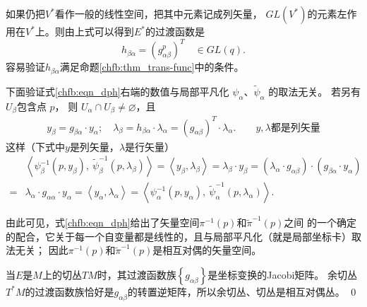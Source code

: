 如果仍把$V^*$看作一般的线性空间，把其中元素记成列矢量，
$GL(V^*)$的元素左作用在$V^*$上。则由上式可以得到$E^*$的过渡函数是
\begin{equation}
    h_{\beta\alpha}= (g^p_{\alpha\beta})^T \quad \in GL(q).
\end{equation}
容易验证$h_{\beta\alpha}$满足命题\ref{chfb:thm_trans-func}中的条件。

下面验证式\eqref{chfb:eqn_dph}右端的数值与局部平凡化 $\psi_\alpha$、$\tilde{\psi}_\alpha$ 的取法无关。 
若另有$U_\beta$包含点 $p$， 则 $U_\alpha \cap U_\beta \neq \varnothing$，且
\begin{align*}
    y_\beta=g_{\beta\alpha} \cdot y_\alpha; \quad
    \lambda_\beta=h_{\beta\alpha}\cdot \lambda_\alpha = (g_{\alpha\beta})^T\cdot \lambda_\alpha .
    \qquad y,\lambda \text{都是列矢量}
\end{align*}
这样（下式中$y$是列矢量，$\lambda$是行矢量）
\begin{align*}
    &\left\langle\psi_\beta^{-1} (p, y_\beta),\ \tilde{\psi}_\beta^{-1} (p, \lambda_\beta )\right\rangle
    = \left\langle y_\beta, \lambda_\beta\right\rangle 
    =  \lambda_\beta \cdot y_\beta = (\lambda_\alpha \cdot g_{\alpha\beta})\cdot (g_{\beta\alpha} \cdot y_\alpha) \\
    =& \lambda_\alpha \cdot  g_{\alpha\alpha}\cdot  y_\alpha =  \left\langle y_\alpha, \lambda_\alpha \right\rangle
    =\left\langle\psi_\alpha^{-1} (p, y_\alpha),\ \tilde{\psi}_\alpha^{-1} (p, \lambda_\alpha )\right\rangle. 
\end{align*}

由此可见，式\eqref{chfb:eqn_dph}给出了矢量空间$\pi^{-1}(p)$和$\tilde{\pi}^{-1}(p)$之间
的一个确定的配合，它关于每一个自变量都是线性的，且与局部平凡化（就是局部坐标卡）取法无关；
因此$\pi^{-1}(p)$和$\tilde{\pi}^{-1}(p)$是相互对偶的矢量空间。

当$E$是$M$上的切丛$TM$时，其过渡函数族$\left\{g_{\alpha\beta}\right\}$是坐标变换的Jacobi矩阵。
余切丛$T^*M$的过渡函数族恰好是$g_{\alpha\beta}$的转置逆矩阵，所以余切丛、切丛是相互对偶丛。
\qed




